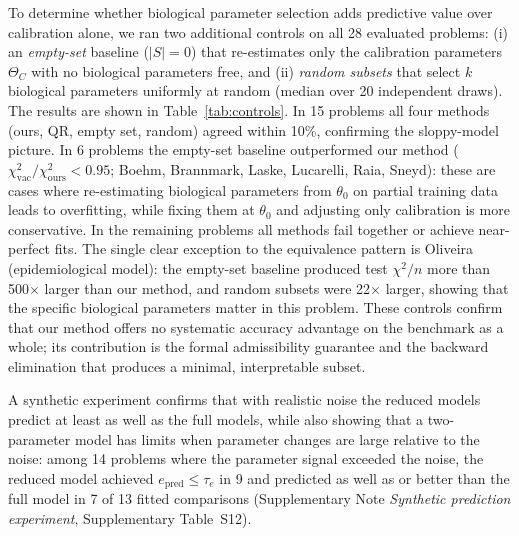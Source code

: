 \documentclass[pdflatex,sn-nature]{sn-jnl}
\theoremstyle{plain}
\begin{document}
To determine whether biological parameter selection adds predictive value over calibration alone, we ran two additional controls on all 28 evaluated problems: (i) an \emph{empty-set} baseline ($|S|=0$) that re-estimates only the calibration parameters $\Theta_C$ with no biological parameters free, and (ii) \emph{random subsets} that select $k$ biological parameters uniformly at random (median over 20 independent draws). The results are shown in Table~\ref{tab:controls}. In 15 problems all four methods (ours, QR, empty set, random) agreed within 10\%, confirming the sloppy-model picture. In 6 problems the empty-set baseline outperformed our method ($\chi^2_{\mathrm{vac}}/\chi^2_{\mathrm{ours}}<0.95$; Boehm, Brannmark, Laske, Lucarelli, Raia, Sneyd): these are cases where re-estimating biological parameters from $\theta_0$ on partial training data leads to overfitting, while fixing them at $\theta_0$ and adjusting only calibration is more conservative. In the remaining problems all methods fail together or achieve near-perfect fits. The single clear exception to the equivalence pattern is Oliveira (epidemiological model): the empty-set baseline produced test $\chi^2/n$ more than 500$\times$ larger than our method, and random subsets were 22$\times$ larger, showing that the specific biological parameters matter in this problem. These controls confirm that our method offers no systematic accuracy advantage on the benchmark as a whole; its contribution is the formal admissibility guarantee and the backward elimination that produces a minimal, interpretable subset.

A synthetic experiment confirms that with realistic noise the reduced models predict at least as well as the full models, while also showing that a two-parameter model has limits when parameter changes are large relative to the noise: among 14 problems where the parameter signal exceeded the noise, the reduced model achieved $e_{\mathrm{pred}}\le\tau_e$ in 9 and predicted as well as or better than the full model in 7 of 13 fitted comparisons (Supplementary Note \textit{Synthetic prediction experiment}, Supplementary Table~S12).
\end{document}
